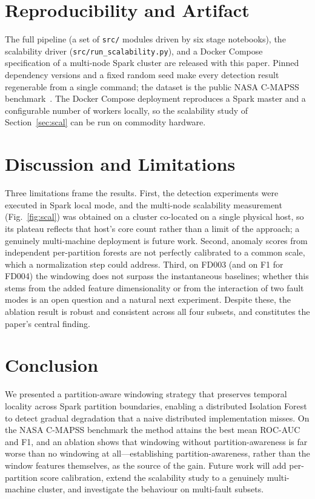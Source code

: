 \documentclass[conference]{IEEEtran}
\begin{document}
\section{Reproducibility and Artifact}
\label{sec:artifact}
The full pipeline (a set of \texttt{src/} modules driven by six stage notebooks), the scalability driver (\texttt{src/run\_scalability.py}), and a Docker Compose specification of a multi-node Spark cluster are released with this paper. Pinned dependency versions and a fixed random seed make every detection result regenerable from a single command; the dataset is the public NASA C-MAPSS benchmark~\cite{saxena2008damage}. The Docker Compose deployment reproduces a Spark master and a configurable number of workers locally, so the scalability study of Section~\ref{sec:scal} can be run on commodity hardware.

\section{Discussion and Limitations}
Three limitations frame the results. First, the detection experiments were executed in Spark local mode, and the multi-node scalability measurement (Fig.~\ref{fig:scal}) was obtained on a cluster co-located on a single physical host, so its plateau reflects that host's core count rather than a limit of the approach; a genuinely multi-machine deployment is future work. Second, anomaly scores from independent per-partition forests are not perfectly calibrated to a common scale, which a normalization step could address. Third, on FD003 (and on F1 for FD004) the windowing does not surpass the instantaneous baselines; whether this stems from the added feature dimensionality or from the interaction of two fault modes is an open question and a natural next experiment. Despite these, the ablation result is robust and consistent across all four subsets, and constitutes the paper's central finding.

\section{Conclusion}
We presented a partition-aware windowing strategy that preserves temporal locality across Spark partition boundaries, enabling a distributed Isolation Forest to detect gradual degradation that a naive distributed implementation misses. On the NASA C-MAPSS benchmark the method attains the best mean ROC-AUC and F1, and an ablation shows that windowing without partition-awareness is far worse than no windowing at all---establishing partition-awareness, rather than the window features themselves, as the source of the gain. Future work will add per-partition score calibration, extend the scalability study to a genuinely multi-machine cluster, and investigate the behaviour on multi-fault subsets.
\end{document}
